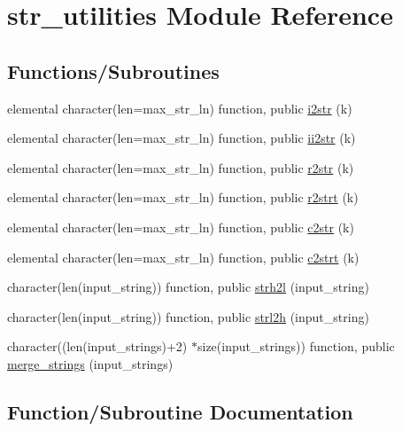 \hypertarget{namespacestr__utilities}{}\section{str\+\_\+utilities Module Reference}
\label{namespacestr__utilities}
\subsection*{Functions/\+Subroutines}
\begin{DoxyCompactItemize}
\item 
elemental character(len=max\+\_\+str\+\_\+ln) function, public \hyperlink{namespacestr__utilities_a0b97e51770725a3e98ed393d26681414}{i2str} (k)
\item 
elemental character(len=max\+\_\+str\+\_\+ln) function, public \hyperlink{namespacestr__utilities_acb8c4e66aead51f178e47fdea8d7a7db}{ii2str} (k)
\item 
elemental character(len=max\+\_\+str\+\_\+ln) function, public \hyperlink{namespacestr__utilities_a92ac6c0af1979df094de1caddd28ade0}{r2str} (k)
\item 
elemental character(len=max\+\_\+str\+\_\+ln) function, public \hyperlink{namespacestr__utilities_ac778d706b2e021672618939ab58fdd32}{r2strt} (k)
\item 
elemental character(len=max\+\_\+str\+\_\+ln) function, public \hyperlink{namespacestr__utilities_a308e943e5e244e3e0f852f2ecb3e3183}{c2str} (k)
\item 
elemental character(len=max\+\_\+str\+\_\+ln) function, public \hyperlink{namespacestr__utilities_abca28d6272d447dc1c0c100624c6ed75}{c2strt} (k)
\item 
character(len(input\+\_\+string)) function, public \hyperlink{namespacestr__utilities_a219964a283968cc6a968db0197d2187e}{strh2l} (input\+\_\+string)
\item 
character(len(input\+\_\+string)) function, public \hyperlink{namespacestr__utilities_a7e2e441d509c12045a3373819040a806}{strl2h} (input\+\_\+string)
\item 
character((len(input\+\_\+strings)+2) $\ast$size(input\+\_\+strings)) function, public \hyperlink{namespacestr__utilities_a6ab16f33c155db79844279c6a56a494c}{merge\+\_\+strings} (input\+\_\+strings)
\end{DoxyCompactItemize}


\subsection{Function/\+Subroutine Documentation}
\mbox{\label{namespacestr__utilities_a308e943e5e244e3e0f852f2ecb3e3183}} 
